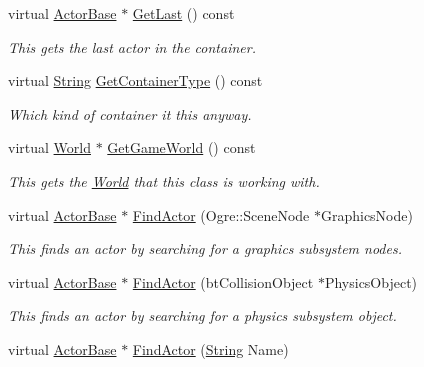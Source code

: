 \begin{DoxyCompactItemize}
virtual \hyperlink{classphys_1_1ActorBase}{ActorBase} $\ast$ \hyperlink{classphys_1_1ActorContainerVector_a211f6e419ef0b753cecf2c662a54511e}{GetLast} () const 
\begin{DoxyCompactList}\small\item\em This gets the last actor in the container. \item\end{DoxyCompactList}\item 
virtual \hyperlink{namespacephys_aa03900411993de7fbfec4789bc1d392e}{String} \hyperlink{classphys_1_1ActorContainerVector_ae18c29b30d840e0f4fc9b553dd5ca32c}{GetContainerType} () const 
\begin{DoxyCompactList}\small\item\em Which kind of container it this anyway. \item\end{DoxyCompactList}\item 
virtual \hyperlink{classphys_1_1World}{World} $\ast$ \hyperlink{classphys_1_1ActorContainerVector_a5519eb0000073a2f397e158bfc368349}{GetGameWorld} () const 
\begin{DoxyCompactList}\small\item\em This gets the \hyperlink{classphys_1_1World}{World} that this class is working with. \item\end{DoxyCompactList}\item 
virtual \hyperlink{classphys_1_1ActorBase}{ActorBase} $\ast$ \hyperlink{classphys_1_1ActorContainerVector_a99ea0e27153c0a652264853fca7cd1b1}{FindActor} (Ogre::SceneNode $\ast$GraphicsNode)
\begin{DoxyCompactList}\small\item\em This finds an actor by searching for a graphics subsystem nodes. \item\end{DoxyCompactList}\item 
virtual \hyperlink{classphys_1_1ActorBase}{ActorBase} $\ast$ \hyperlink{classphys_1_1ActorContainerVector_a5ebcdeb3018f3baf92154ddec79cd054}{FindActor} (btCollisionObject $\ast$PhysicsObject)
\begin{DoxyCompactList}\small\item\em This finds an actor by searching for a physics subsystem object. \item\end{DoxyCompactList}\item 
virtual \hyperlink{classphys_1_1ActorBase}{ActorBase} $\ast$ \hyperlink{classphys_1_1ActorContainerVector_ae04f8c6dd9b07ef9c1456707be9e155b}{FindActor} (\hyperlink{namespacephys_aa03900411993de7fbfec4789bc1d392e}{String} Name)

\end{DoxyCompactItemize}
